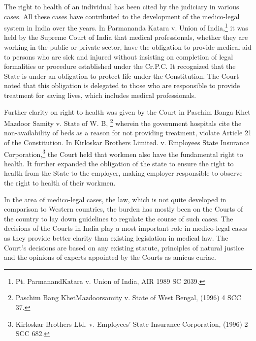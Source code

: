 \begin{multicols}{2}
\vspace{-.15cm}


\vspace{-.1cm}

\noi
The right to health of an individual has been cited by the judiciary in various cases. All these
cases have contributed to the development of the medico-legal system in India over the years. In
Parmananda Katara v. Union of India,\footnote{Pt. ParmanandKatara v. Union of India, AIR 1989 SC 2039.} it was held by the Supreme Court of India that medical professionals, whether they are working in the public or private sector, have the obligation to provide medical aid to persons who are sick and injured without insisting on completion of legal formalities or procedure established under the Cr.P.C. It recognized that the State is under an obligation to protect life under the Constitution. The Court noted that this obligation is delegated to those who are responsible to provide treatment for saving lives, which includes medical professionals.

\vspace{-.1cm}

\noi
Further clarity on right to health was given by the Court in Paschim Banga Khet Mazdoor Samity
v. State of W. B, \footnote{Paschim Bang KhetMazdoorsamity v. State of West Bengal, (1996) 4 SCC 37.} wherein the government hospitals cite the non-availability of beds as a reason for not providing treatment, violate Article 21 of the Constitution. In Kirloskar Brothers Limited. v. Employees State Insurance Corporation,\footnote{Kirloskar Brothers Ltd. v. Employees' State Insurance Corporation, (1996) 2 SCC 682.} the Court held that workmen also have the
fundamental right to health. It further expanded the obligation of the state to ensure the right to
health from the State to the employer, making employer responsible to observe the right to health
of their workmen.

\vspace{-.15cm}

\noi
In the area of medico-legal cases, the law, which is not quite developed in comparison to Western
countries, the burden has mostly been on the Courts of the country to lay down guidelines to
regulate the course of such cases. The decisions of the Courts in India play a most important role
in medico-legal cases as they provide better clarity than existing legislation in medical law. The Court’s decisions are based on any existing statute, principles of natural justice and the opinions
of experts appointed by the Courts as amicus curiae.


\end{multicols}

